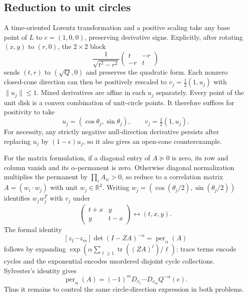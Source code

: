 \documentclass[11pt,a4paper]{article}
\theoremstyle{definition}\newtheorem{definition}[theorem]{Definition}
\theoremstyle{remark}\newtheorem{remark}[theorem]{Remark}
\newcommand{\R}{\mathbb R}\newcommand{\C}{\mathbb C}\newcommand{\N}{\mathbb N}
\DeclareMathOperator{\tr}{tr}\DeclareMathOperator{\supp}{supp}\DeclareMathOperator{\TV}{TV}
\numberwithin{equation}{section}
\begin{document}
\subsection{Reduction to unit circles}\label{S08-sec-2}
A time-oriented Lorentz transformation and a positive scaling take any base point of $L$ to $e=(1,0,0)$, preserving derivative signs. Explicitly, after rotating $(x,y)$ to $(r,0)$, the $2\times2$ block
\[
 \frac1{\sqrt{t^2-r^2}}\begin{pmatrix}t&-r\\-r&t\end{pmatrix}
\]
sends $(t,r)$ to $(\sqrt Q,0)$ and preserves the quadratic form. Each nonzero closed-cone direction can then be positively rescaled to $v_j=\tfrac12(1,u_j)$ with $\|u_j\|\le1$.
Mixed derivatives are affine in each $u_j$ separately. Every point of the unit disk is a convex combination of unit-circle points. It therefore suffices for positivity to take
\[
 u_j=(\cos\theta_j,\sin\theta_j),\qquad
 v_j=\tfrac12(1,u_j).
\]
For necessity, any strictly negative null-direction derivative persists after replacing $u_j$ by $(1-\epsilon)u_j$, so it also gives an open-cone counterexample.

For the matrix formulation, if a diagonal entry of $A\succeq0$ is zero, its row and column vanish and its $\alpha$-permanent is zero. Otherwise diagonal normalization multiplies the permanent by $\prod_i A_{ii}>0$, so reduce to a correlation matrix $A=(w_i\cdot w_j)$ with unit $w_j\in\R^2$. Writing $w_j=(\cos(\theta_j/2),\sin(\theta_j/2))$ identifies $w_jw_j^T$ with $v_j$ under
\[
 \begin{pmatrix}t+x&y\\y&t-x\end{pmatrix}\longleftrightarrow(t,x,y).
\]
The formal identity
\begin{equation}\label{S08-mac}
 [z_1\cdots z_m]\det(I-ZA)^{-\alpha}=\operatorname{per}_\alpha(A)
\end{equation}
follows by expanding $\exp(\alpha\sum_{\ell\ge1}\tr((ZA)^\ell)/\ell)$: trace terms encode cycles and the exponential encodes unordered disjoint cycle collections. Sylvester's identity gives
\begin{equation}\label{S08-der}
 \operatorname{per}_\alpha(A)=(-1)^mD_{v_1}\cdots D_{v_m}Q^{-\alpha}(e).
\end{equation}
Thus it remains to control the same circle-direction expression in both problems.
\end{document}

